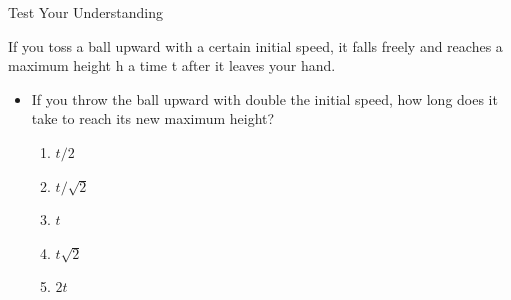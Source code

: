\documentclass[]{beamer}
\begin{document}


\begin{frame}
    Test Your Understanding
    \vspace{3mm}
 
    
If you toss a ball upward with a certain initial speed, it falls freely and reaches a maximum 
height h a time t after it leaves your hand.
\vspace{3mm}


\begin{itemize}
        \pause
    \item If you throw the ball upward with double the initial speed, how long does it take to
    reach its new maximum height?
        \begin{enumerate}
            \item $t/2$
            \item $t/\sqrt{2}$
            \item $t$
            \item $t\sqrt{2}$
            \item $2t$
        \end{enumerate}
\end{itemize}

    
    \end{frame}



 
\end{document}
